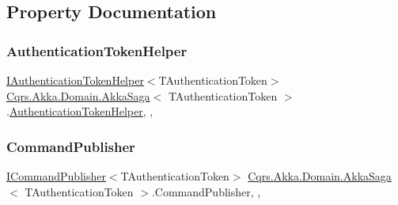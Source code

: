 \subsection{Property Documentation}
\mbox{\label{classCqrs_1_1Akka_1_1Domain_1_1AkkaSaga_a18e4d7faa9cd9d10ac2ac0bd3b6c9fc9_a18e4d7faa9cd9d10ac2ac0bd3b6c9fc9}} 
\subsubsection{\texorpdfstring{Authentication\+Token\+Helper}{AuthenticationTokenHelper}}
{\footnotesize\ttfamily \hyperlink{interfaceCqrs_1_1Authentication_1_1IAuthenticationTokenHelper}{I\+Authentication\+Token\+Helper}$<$T\+Authentication\+Token$>$ \hyperlink{classCqrs_1_1Akka_1_1Domain_1_1AkkaSaga}{Cqrs.\+Akka.\+Domain.\+Akka\+Saga}$<$ T\+Authentication\+Token $>$.\hyperlink{classCqrs_1_1Authentication_1_1AuthenticationTokenHelper}{Authentication\+Token\+Helper}\hspace{0.3cm}{\ttfamily [get]}, {\ttfamily [set]}, {\ttfamily [protected]}}

\mbox{\label{classCqrs_1_1Akka_1_1Domain_1_1AkkaSaga_ac00968d1d69d89d46b43af10fc0d4510_ac00968d1d69d89d46b43af10fc0d4510}} 
\subsubsection{\texorpdfstring{Command\+Publisher}{CommandPublisher}}
{\footnotesize\ttfamily \hyperlink{interfaceCqrs_1_1Commands_1_1ICommandPublisher}{I\+Command\+Publisher}$<$T\+Authentication\+Token$>$ \hyperlink{classCqrs_1_1Akka_1_1Domain_1_1AkkaSaga}{Cqrs.\+Akka.\+Domain.\+Akka\+Saga}$<$ T\+Authentication\+Token $>$.Command\+Publisher\hspace{0.3cm}{\ttfamily [get]}, {\ttfamily [set]}, {\ttfamily [protected]}}

